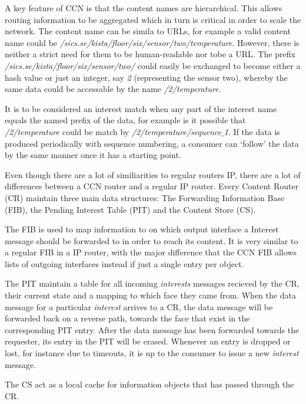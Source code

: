 A key feature of CCN is that the content names are hierarchical. This allows routing information to be aggregated which in turn is critical in order to scale the network. The content name can be simila to URLs, for example a valid content name could be \textit{/sics.se/kista/floor/six/sensor/two/temperature}. However, there is neither a strict need for them to be human-readable nor tobe a URL. The prefix \textit{/sics.se/kista/floor/six/sensor/two/} could easily be exchanged to become either a hash value or just an integer, say \textit{2} (representing the sensor two), whereby the same data could be accessable by the name \textit{/2/temperature}.

It is to be considered an interest match  when any part of the interest name equals the named prefix of the data, for example is it possible that \textit{/2/temperature} could be match by \textit{/2/temperature/sequence$\_$1}. If the data is produced periodically with sequence numbering, a consumer can `follow' the data by the same manner once it has a starting point. 

Even though there are a lot of similiarities to regular routers IP, there are a lot of differences between a CCN router and a regular IP router.
Every Content Router (CR) maintain three main data structures: The Forwarding Information Base (FIB), the Pending Interest Table (PIT) and the Content Store (CS).

The FIB is used to map information to on which output interface a Interest message should be forwarded to in order to reach its content. It is very similar to a regular FIB in a IP router, with the major difference that the CCN FIB allows lists of outgoing interfaces instead if just a single entry per object.

The PIT maintain a table for all incoming \textit{interests} messages recieved by the CR, their current state and a mapping to which face they came from. When the data message for a particular \textit{interest} arrives to a CR, the data message will be forwarded back on a reverse path, towards the face that exist in the corresponding PIT entry. After the data message has been forwarded towards the requester, its entry in the PIT will be erased. Whenever an entry is dropped or lost, for instance due to timeouts, it is up to the consumer to issue a new \textit{interest} message.\

The CS act as a local cache for information objects that has passed through the CR.

